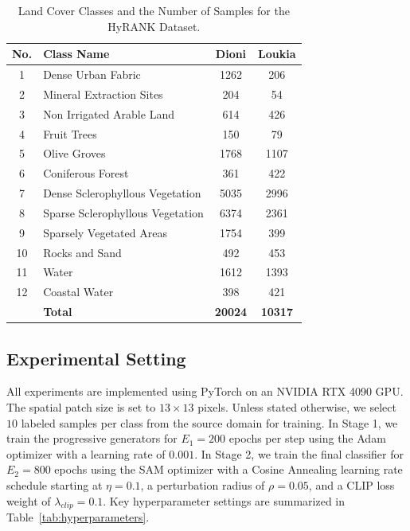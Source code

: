 \begin{table}[h]
\centering
\caption{Land Cover Classes and the Number of Samples for the HyRANK Dataset.}
\label{tab:hyrank_classes}
\begin{tabular}{clcc}
\toprule
\textbf{No.} & \textbf{Class Name} & \textbf{Dioni} & \textbf{Loukia} \\
\midrule
1  & Dense Urban Fabric              & 1262  & 206   \\
2  & Mineral Extraction Sites        & 204   & 54    \\
3  & Non Irrigated Arable Land       & 614   & 426   \\
4  & Fruit Trees                     & 150   & 79    \\
5  & Olive Groves                    & 1768  & 1107  \\
6  & Coniferous Forest               & 361   & 422   \\
7  & Dense Sclerophyllous Vegetation & 5035  & 2996  \\
8  & Sparse Sclerophyllous Vegetation& 6374  & 2361  \\
9  & Sparsely Vegetated Areas        & 1754  & 399   \\
10 & Rocks and Sand                  & 492   & 453   \\
11 & Water                           & 1612  & 1393  \\
12 & Coastal Water                   & 398   & 421   \\
\midrule
   & \textbf{Total}                  & \textbf{20024} & \textbf{10317} \\
\bottomrule
\end{tabular}
\end{table}



\subsection{Experimental Setting}
All experiments are implemented using PyTorch on an NVIDIA RTX 4090 GPU. The spatial patch size is set to $13 \times 13$ pixels. Unless stated otherwise, we select $10$ labeled samples per class from the source domain for training. In Stage 1, we train the progressive generators for $E_1 = 200$ epochs per step using the Adam optimizer with a learning rate of $0.001$. In Stage 2, we train the final classifier for $E_2 = 800$ epochs using the SAM optimizer with a Cosine Annealing learning rate schedule starting at $\eta = 0.1$, a perturbation radius of $\rho = 0.05$, and a CLIP loss weight of $\lambda_{clip} = 0.1$. Key hyperparameter settings are summarized in Table~\ref{tab:hyperparameters}.


